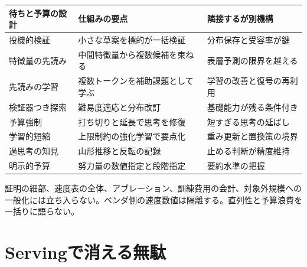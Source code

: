\documentclass[lualatex,a4paper,10pt]{jlreq}
\begin{document}
\begin{center}
\small
\begin{tabularx}{\textwidth}{@{}p{}p{}X@{}}
\toprule
待ちと予算の設計 & 仕組みの要点 & 隣接するが別機構 \\
\midrule
投機的検証 & 小さな草案を標的が一括検証 & 分布保存と受容率が鍵 \\
特徴量の先読み & 中間特徴量から複数候補を束ねる & 表層予測の限界を越える \\
先読みの学習 & 複数トークンを補助課題として学ぶ & 学習の改善と復号の再利用 \\
検証器つき探索 & 難易度適応と分布改訂 & 基礎能力が残る条件付き \\
予算強制 & 打ち切りと延長で思考を修復 & 短すぎる思考の延ばし \\
学習的短縮 & 上限制約の強化学習で要点化 & 重み更新と置換策の境界 \\
過思考の知見 & 山形推移と反転の記録 & 止める判断が精度維持 \\
明示的予算 & 努力量の数値指定と段階指定 & 要約水準の把握 \\
\bottomrule
\end{tabularx}
\end{center}
\autocite{specdecode,eagle,mtp,snell2024,thinkprune,overthink}

\begin{claimboundary}[本節の読解上の境界]
証明の細部、速度表の全体、アブレーション、訓練費用の会計、対象外規模への一般化には立ち入らない。ベンダ側の速度数値は隔離する。直列性と予算浪費を一括りに語らない。
\end{claimboundary}

\section{Servingで消える無駄}
\label{sec:serving}
\end{document}
